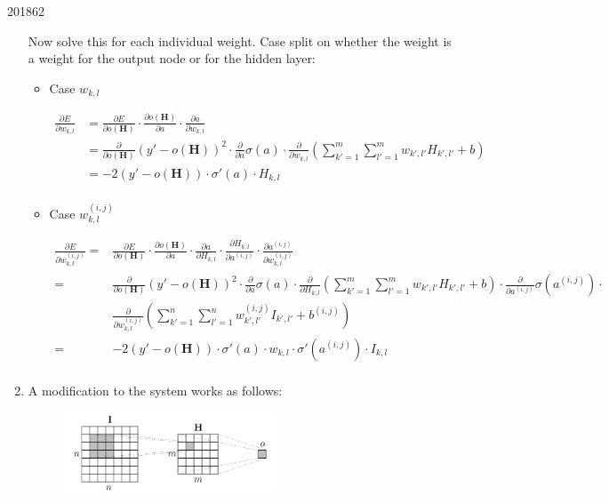 \documentclass[10pt,\jkfside,a4paper]{article}
\begin{document}
\begin{examquestion}{2018}{6}{2}
\begin{enumerate}[label=(\alph*)]
Now solve this for each individual weight. Case split on whether the weight
is a weight for the output node or for the hidden layer:

\begin{itemize}

\item Case $w_{k, l}$

\begin{align*}
\frac{\partial E}{\partial w_{k, l}}
&=
\frac{\partial E}{\partial o(\mathbf H)}
\cdot
\frac{\partial o(\mathbf H)}{\partial a}
\cdot
\frac{\partial a}{\partial w_{k, l}}
\\
&=
\frac{\partial}{\partial o(\mathbf H)}\left( y' - o(\mathbf H) \right)^2
\cdot
\frac{\partial}{\partial a}\sigma(a)
\cdot
\frac{\partial}{\partial w_{k, l}}
\left(
\sum^{m}_{k'=1} \sum^{m}_{l'=1} w_{k', l'} H_{k', l'} + b
\right)
\\
&=
-2\left( y' - o(\mathbf H) \right)
\cdot
\sigma'(a)
\cdot
H_{k, l}
\\
\end{align*}

\item Case $w^{(i, j)}_{k, l}$

\begin{align*}
\frac{\partial E}{\partial w^{(i, j)}_{k, l}}
=&
\frac{\partial E}{\partial o(\mathbf H)}
\cdot
\frac{\partial o(\mathbf H)}{\partial a}
\cdot
\frac{\partial a}{\partial H_{k, l}}
\cdot
\frac{\partial H_{k, l}}{\partial a^{(i, j)}}
\cdot
\frac{\partial a^{(i, j)}}{\partial w^{(i, j)}_{k, l}}
\\
=&
\frac{\partial}{\partial o(\mathbf H)}(y' - o(\mathbf H))^2
\cdot
\frac{\partial}{\partial a}\sigma(a)
\cdot
\frac{\partial}{\partial H_{k, l}}
\left(
\sum^{m}_{k'=1} \sum^{m}_{l'=1} w_{k', l'}H_{k', l'} + b
\right)
\cdot
\frac{\partial}{\partial a^{(i, j)}}\sigma(a^{(i, j)})
\cdot
\\
&\frac{\partial}{\partial w^{(i, j)}_{k, l}}
\left(
\sum^{n}_{k'=1} \sum^{n}_{l'=1} w^{(i, j)}_{k', l'}I_{k', l'} + b^{(i, j)}
\right)
\\
=&
-2(y' - o(\mathbf H))
\cdot
\sigma'(a)
\cdot
w_{k, l}
\cdot
\sigma'(a^{(i, j)})
\cdot
I_{k, l}
\\
\end{align*}

\end{itemize}

\item A modification to the system works as follows:
\begin{figure}[H]
\centering
\includegraphics[width=0.6\textwidth]{2018modification}
\end{figure}


\end{enumerate}
\end{examquestion}
\end{document}
